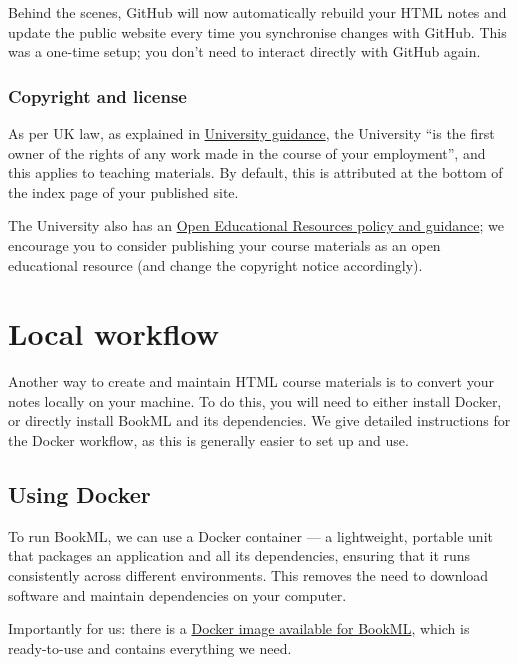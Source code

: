 Behind the scenes, GitHub will now automatically rebuild your HTML notes and update the public website every time you synchronise changes with GitHub. This was a one-time setup; you don't need to interact directly with GitHub again.

\subsubsection*{Copyright and license}
\label{ssec:pub:license}

As per UK law, as explained in \href{https://library.ed.ac.uk/library-help/copyright/copyright-teaching}{University guidance}, the University ``is the first owner of the rights of any work made in the course of your employment'', and this applies to teaching materials. By default, this is attributed at the bottom of the index page of your published site.

The University also has an \href{https://open.ed.ac.uk/how-to-guides/}{Open Educational Resources policy and guidance}; we encourage you to consider publishing your course materials as an open educational resource (and change the copyright notice accordingly).


\section{Local workflow}

Another way to create and maintain HTML course materials is to convert your notes locally on your machine. To do this, you will need to either install Docker, or directly install BookML and its dependencies. We give detailed instructions for the Docker workflow, as this is generally easier to set up and use.

\subsection{Using Docker}
\label{ssec:docker}

To run BookML, we can use a Docker container --- a lightweight, portable unit that packages an application and all its dependencies, ensuring that it runs consistently across different environments. This removes the need to download software and maintain dependencies on your computer.

Importantly for us: there is a \href{https://github.com/vlmantova/bookml/pkgs/container/bookml}{Docker image available for BookML}, which is ready-to-use and contains everything we need.

